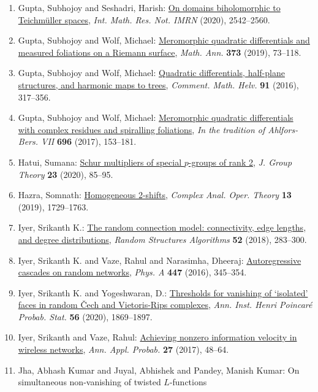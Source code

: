 \begin{enumerate}
\item Gupta, Subhojoy and Seshadri, Harish: \href{https://doi.org/10.1093/imrn/rny204}{On domains biholomorphic to {T}eichm\"{u}ller spaces}, \emph{Int. Math. Res. Not. IMRN} {\bf } (2020), 2542--2560.
\item Gupta, Subhojoy and Wolf, Michael: \href{https://doi.org/10.1007/s00208-018-1674-z}{Meromorphic quadratic differentials and measured foliations on
a {R}iemann surface}, \emph{Math. Ann.} {\bf 373} (2019), 73--118.
\item Gupta, Subhojoy and Wolf, Michael: \href{https://doi.org/10.4171/CMH/388}{Quadratic differentials, half-plane structures, and harmonic
maps to trees}, \emph{Comment. Math. Helv.} {\bf 91} (2016), 317--356.
\item Gupta, Subhojoy and Wolf, Michael: \href{https://doi.org/10.1090/conm/696/14021}{Meromorphic quadratic differentials with complex residues and
spiralling foliations}, \emph{In the tradition of {A}hlfors-{B}ers. {VII}} {\bf 696} (2017), 153--181.
\item Hatui, Sumana: \href{https://doi.org/10.1515/jgth-2019-0045}{Schur multipliers of special {$p$}-groups of rank 2}, \emph{J. Group Theory} {\bf 23} (2020), 85--95.
\item Hazra, Somnath: \href{https://doi.org/10.1007/s11785-018-0822-5}{Homogeneous 2-shifts}, \emph{Complex Anal. Oper. Theory} {\bf 13} (2019), 1729--1763.
\item Iyer, Srikanth K.: \href{https://doi.org/10.1002/rsa.20741}{The random connection model: connectivity, edge lengths, and
degree distributions}, \emph{Random Structures Algorithms} {\bf 52} (2018), 283--300.
\item Iyer, Srikanth K. and Vaze, Rahul and Narasimha, Dheeraj: \href{https://doi.org/10.1016/j.physa.2015.12.030}{Autoregressive cascades on random networks}, \emph{Phys. A} {\bf 447} (2016), 345--354.
\item Iyer, Srikanth K. and Yogeshwaran, D.: \href{https://doi.org/10.1214/19-AIHP1020}{Thresholds for vanishing of `isolated' faces in random \v{C}ech
and {V}ietoris-{R}ips complexes}, \emph{Ann. Inst. Henri Poincar\'{e} Probab. Stat.} {\bf 56} (2020), 1869--1897.
\item Iyer, Srikanth and Vaze, Rahul: \href{https://doi.org/10.1214/16-AAP1196}{Achieving nonzero information velocity in wireless networks}, \emph{Ann. Appl. Probab.} {\bf 27} (2017), 48--64.
\item Jha, Abhash Kumar and Juyal, Abhishek and Pandey, Manish
Kumar: On simultaneous non-vanishing of twisted {$L$}-functions

\end{enumerate}
